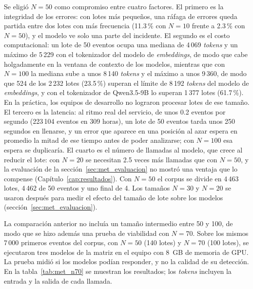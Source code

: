 Se eligió $N = 50$ como compromiso entre cuatro factores. El primero es la integridad de los errores: con lotes más pequeños, una ráfaga de errores queda partida entre dos lotes con más frecuencia (11.3\,\% con $N = 10$ frente a 2.3\,\% con $N = 50$), y el modelo ve solo una parte del incidente. El segundo es el costo computacional: un lote de 50 eventos ocupa una mediana de 4\,069 \textit{tokens} y un máximo de 5\,229 con el tokenizador del modelo de \textit{embeddings}, de modo que cabe holgadamente en la ventana de contexto de los modelos, mientras que con $N = 100$ la mediana sube a unos 8\,140 \textit{tokens} y el máximo a unos 9\,360, de modo que 524 de los 2\,232 lotes (23.5\,\%) superan el límite de 8\,192 \textit{tokens} del modelo de \textit{embeddings}, y con el tokenizador de Qwen3.5-9B lo superan 1\,377 lotes (61.7\,\%). En la práctica, los equipos de desarrollo no lograron procesar lotes de ese tamaño. El tercero es la latencia: al ritmo real del servicio, de unos 0.2 eventos por segundo (223\,104 eventos en 309 horas), un lote de 50 eventos tarda unos 250 segundos en llenarse, y un error que aparece en una posición al azar espera en promedio la mitad de ese tiempo antes de poder analizarse; con $N = 100$ esa espera se duplicaría. El cuarto es el número de llamadas al modelo, que crece al reducir el lote: con $N = 20$ se necesitan 2.5 veces más llamadas que con $N = 50$, y la evaluación de la sección~\ref{sec:met_evaluacion} no mostró una ventaja que lo compense (Capítulo~\ref{cap:resultados}). Con $N = 50$ el corpus se divide en 4\,463 lotes, 4\,462 de 50 eventos y uno final de 4. Los tamaños $N = 30$ y $N = 20$ se usaron después para medir el efecto del tamaño de lote sobre los modelos (sección~\ref{sec:met_evaluacion}).

La comparación anterior no incluía un tamaño intermedio entre 50 y 100, de modo que se hizo además una prueba de viabilidad con $N = 70$. Sobre los mismos 7\,000 primeros eventos del corpus, con $N = 50$ (140 lotes) y $N = 70$ (100 lotes), se ejecutaron tres modelos de la matriz en el equipo con 8~GB de memoria de GPU. La prueba midió si los modelos podían responder, y no la calidad de su detección. En la tabla~\ref{tab:met_n70} se muestran los resultados; los \textit{tokens} incluyen la entrada y la salida de cada llamada.

